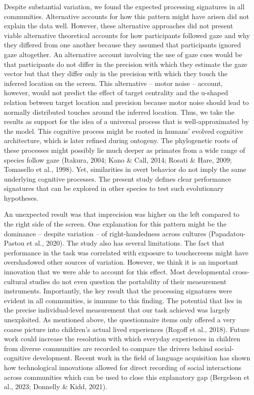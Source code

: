 \documentclass[
  man,floatsintext]{apa7}
\begin{document}
Despite substantial variation, we found the expected processing signatures in all communities. Alternative accounts for how this pattern might have arisen did not explain the data well. However, these alternative approaches did not present viable alternative theoretical accounts for how participants followed gaze and why they differed from one another because they assumed that participants ignored gaze altogether. An alternative account involving the use of gaze cues would be that participants do not differ in the precision with which they estimate the gaze vector but that they differ only in the precision with which they touch the inferred location on the screen. This alternative -- motor noise -- account, however, would not predict the effect of target centrality and the u-shaped relation between target location and precision because motor noise should lead to normally distributed touches around the inferred location. Thus, we take the results as support for the idea of a universal process that is well-approximated by the model. This cognitive process might be rooted in humans' evolved cognitive architecture, which is later refined during ontogeny. The phylogenetic roots of these processes might possibly lie much deeper as primates from a wide range of species follow gaze (Itakura, 2004; Kano \& Call, 2014; Rosati \& Hare, 2009; Tomasello et al., 1998). Yet, similarities in overt behavior do not imply the same underlying cognitive processes. The present study defines clear performance signatures that can be explored in other species to test such evolutionary hypotheses.

An unexpected result was that imprecision was higher on the left compared to the right side of the screen. One explanation for this pattern might be the dominance -- despite variation -- of right-handedness across cultures (Papadatou-Pastou et al., 2020). The study also has several limitations. The fact that performance in the task was correlated with exposure to touchscreens might have overshadowed other sources of variation. However, we think it is an important innovation that we were able to account for this effect. Most developmental cross-cultural studies do not even question the portability of their measurement instruments. Importantly, the key result that the processing signatures were evident in all communities, is immune to this finding. The potential that lies in the precise individual-level measurement that our task achieved was largely unexploited. As mentioned above, the questionnaire items only offered a very coarse picture into children's actual lived experiences (Rogoff et al., 2018). Future work could increase the resolution with which everyday experiences in children from diverse communities are recorded to compare the drivers behind social-cognitive development. Recent work in the field of language acquisition has shown how technological innovations allowed for direct recording of social interactions across communities which can be used to close this explanatory gap (Bergelson et al., 2023; Donnelly \& Kidd, 2021).
\end{document}
